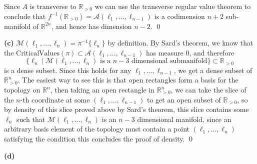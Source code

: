 \documentclass[10.5pt]{article}
\theoremstyle{definition}
\newcommand{\set}[1]{\{#1\}}
\begin{document}
    Since \(A\) is transverse to \(\mathbb{R}_{>0}\) we can use the transverse regular value theorem to conclude that \(f^{-1}(\mathbb{R}_{>0}) = \mathcal{A}(\ell_1,\hdots,\ell_{n-1})\) is a codimension \(n+2\) sub-manifold of \(\mathbb{R}^{2n}\), and hence has dimension \(n-2\). \qed

    \textbf{(c)} \(\mathcal{M}(\ell_1,\hdots,\ell_n) = \pi^{-1}\set{\ell_n}\) by definition. By Sard's theorem, we know that the \(\text{CriticalValues}(\pi) \subset \mathcal{A}(\ell_1,\hdots,\ell_{n-1})\) has measure \(0\), and therefore \[\set{\ell_n \mid \mathcal{M}(\ell_1,\hdots,\ell_n) \text{ is a }n-3\text{ dimensional submanifold}} \subset \mathbb{R}_{>0}\]
    is a dense subset. Since this holds for any \(\ell_1,\hdots,\ell_{n-1}\), we get a dense subset of \(\mathbb{R}_{>0}^{n}\). The easiest way to see this is that open rectangles form a basis for the topology on \(\mathbb{R}^n\), then taking an open rectangle in \(\mathbb{R}_{>0}^n\), we can take the slice of the \(n\)-th coordinate at some \((\ell_1,\hdots,\ell_{n-1})\) to get an open subset of \(\mathbb{R}_{>0}\), so by density of this slice proved above by Sard's theorem, this slice contains some \(\ell_n\) such that \(\mathcal{M}(\ell_1,\hdots,\ell_n)\) is an \(n-3\) dimensional manifold, since an arbitrary basis element of the topology must contain a point \((\ell_1,\hdots,\ell_n)\) satisfying the condition this concludes the proof of density. \qed

    \textbf{(d)}
\end{document}
